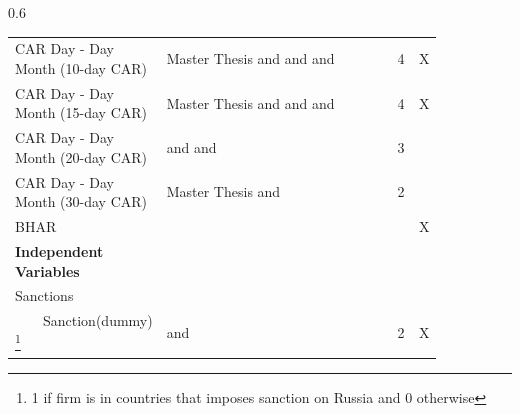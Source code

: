 \documentclass[12pt,a4paper]{article}
\begin{document}
{\begin{appendix}
\begin{landscape}
\begin{spacing}{0.6}
\begin{longtable}[c]{p{0.20\linewidth} p{0.55\linewidth} p{0.05\linewidth} p{0.05\linewidth}}
CAR Day - Day Month (10-day CAR) & Master Thesis and \cite{tee_financial_2023} and \cite{kumari_are_2023} and \cite{kamal_impact_2023} & 4 & X\\
CAR Day - Day Month (15-day CAR) & Master Thesis and \cite{tee_financial_2023} and \cite{kumari_are_2023} and \cite{kamal_impact_2023} & 4 & X\\
CAR Day - Day Month (20-day CAR) & \cite{tee_financial_2023} and \cite{kumari_are_2023} and \cite{kamal_impact_2023} & 3 & \\
CAR Day - Day Month (30-day CAR) & Master Thesis and \cite{kumari_are_2023} & 2 & \\
BHAR &  &   & X \\
\hline
\textbf{Independent Variables} & & & \\
Sanctions &  & &\\
~~~~Sanction(dummy) \footnote{1 if firm is in countries that imposes sanction on Russia and 0 otherwise} & \cite{tee_financial_2023} and \cite{li_china-us_2020} & 2 & X\\

\end{longtable}
\end{spacing}
\end{landscape}
\end{appendix}}
\end{document}
